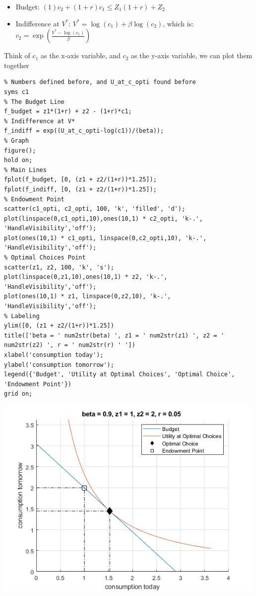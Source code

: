\documentclass[
]{book}
\begin{document}
\begin{itemize}
\item
  Budget: \((1)c_2 +(1+r)c_1 \le Z_1 (1+r)+Z_2\)
\item
  Indifference at \(V^*\): \(V^* =\log (c_1 )+\beta \log (c_2 )\), which
  is: \(c_2 =\exp \left(\frac{V^* -\log (c_1 )}{\beta }\right)\)
\end{itemize}

Think of \(c_1\) as the x-axis variable, and \(c_2\) as the y-axis variable,
we can plot them together

\begin{verbatim}
% Numbers defined before, and U_at_c_opti found before
syms c1
% The Budget Line
f_budget = z1*(1+r) + z2 - (1+r)*c1;
% Indifference at V*
f_indiff = exp((U_at_c_opti-log(c1))/(beta));
% Graph
figure();
hold on;
% Main Lines
fplot(f_budget, [0, (z1 + z2/(1+r))*1.25]);
fplot(f_indiff, [0, (z1 + z2/(1+r))*1.25]);
% Endowment Point
scatter(c1_opti, c2_opti, 100, 'k', 'filled', 'd');
plot(linspace(0,c1_opti,10),ones(10,1) * c2_opti, 'k-.', 'HandleVisibility','off');
plot(ones(10,1) * c1_opti, linspace(0,c2_opti,10), 'k-.', 'HandleVisibility','off');
% Optimal Choices Point
scatter(z1, z2, 100, 'k', 's');
plot(linspace(0,z1,10),ones(10,1) * z2, 'k-.', 'HandleVisibility','off');
plot(ones(10,1) * z1, linspace(0,z2,10), 'k-.', 'HandleVisibility','off');
% Labeling
ylim([0, (z1 + z2/(1+r))*1.25])
title(['beta = ' num2str(beta) ', z1 = ' num2str(z1) ', z2 = ' num2str(z2) ', r = ' num2str(r) ' '])
xlabel('consumption today');
ylabel('consumption tomorrow');
legend({'Budget', 'Utility at Optimal Choices', 'Optimal Choice', 'Endowment Point'})
grid on;
\end{verbatim}

\includegraphics[width=5.20833in,height=\textheight]{img/household_c1_c2_constrained_expmin_images/figure_0.png}
\end{document}
